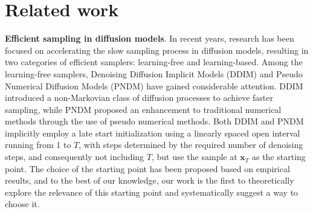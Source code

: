\documentclass{article}
\newcommand{\vect}[1]{\boldsymbol{#1}}
\begin{document}
\section{Related work}

\textbf{Efficient sampling in diffusion models}. In recent years, research has been focused on accelerating the slow sampling process in diffusion models, resulting in two categories of efficient samplers: learning-free and learning-based. Among the learning-free samplers, Denoising Diffusion Implicit Models (DDIM) \citep{song2020denoising} and Pseudo Numerical Diffusion Models (PNDM) \citep{liu2022pseudo} have gained considerable attention. DDIM introduced a non-Markovian class of diffusion processes to achieve faster sampling, while PNDM proposed an enhancement to traditional numerical methods through the use of pseudo numerical methods. Both DDIM and PNDM implicitly employ a late start initialization using a linearly spaced open interval running from 1 to $T$, with steps determined by the required number of denoising steps, and consequently not including $T$, but use the sample at $\vect{x}_T$ as the starting point. The choice of the starting point has been proposed based on empirical results, and to the best of our knowledge, our work is the first to theoretically explore the relevance of this starting point and systematically suggest a way to choose it.\\
\end{document}
